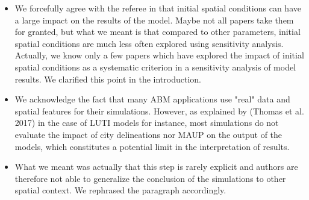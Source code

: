\documentclass[11pt,a4paper,sans]{moderncv}        %
\begin{document}
\begin{itemize}
	\item We forcefully agree with the referee in that initial spatial conditions can have a large impact on the results of the model. Maybe not all papers take them for granted, but what we meant is that compared to other parameters, initial spatial conditions are much less often explored using sensitivity analysis. Actually, we know only a few papers which have explored the impact of initial spatial conditions as a systematic criterion in a sensitivity analysis of model results. We clarified this point in the introduction.

	\item We acknowledge the fact that many ABM applications use "real" data and spatial features for their simulations. However, as explained by (Thomas et al. 2017) in the case of LUTI models for instance, most simulations do not evaluate the impact of city delineations nor MAUP on the output of the models, which constitutes a potential limit in the interpretation of results.
	
	\item What we meant was actually that this step is rarely explicit and authors are therefore not able to generalize the conclusion of the simulations to other spatial context. We rephrased the paragraph accordingly.
	

\end{itemize}
\end{document}
